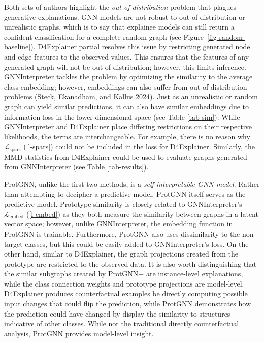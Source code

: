 \documentclass[
  11pt,
  letterpaper,
]{article}
\begin{document}
\quad Both sets of authors highlight the \emph{out-of-distribution}
problem that plagues generative explanations. GNN models are not robust
to out-of-distribution or unrealistic graphs, which is to say that
explainee models can still return a confident classification for a
complete random graph (see Figure~\ref{fig-random-baseline}).
D4Explainer partial resolves this issue by restricting generated node
and edge features to the observed values. This ensures that the features
of any generated graph will not be out-of-distribution; however, this
limits inference. GNNInterpreter tackles the problem by optimizing the
similarity to the average class embedding; however, embeddings can also
suffer from out-of-distribution problems
(\protect\hyperlink{ref-Steck_Ekanadham_Kallus_2024}{Steck, Ekanadham,
and Kallus 2024}). Just as an unrealistic or random graph can yield
similar predictions, it can also have similar embeddings due to
information loss in the lower-dimensional space (see Table
\ref{tab-sim}). While GNNInterpreter and D4Explainer place differing
restrictions on their respective likelihoods, the terms are
interchangeable. For example, there is no reason why
\(\mathcal{L}_\text{spars}\) (\ref{l-spars}) could not be included in
the loss for D4Explainer. Similarly, the MMD statistics from D4Explainer
could be used to evaluate graphs generated from GNNInterpreter (see
Table \ref{tab-results}).

\quad ProtGNN, unlike the first two methods, is a \emph{self
interpretable GNN model}. Rather than attempting to decipher a
predictive model, ProtGNN itself serves as the predictive model.
Prototype similarity is closely related to GNNInterpreter's
\(\mathcal{L}_\text{embed}\) (\ref{l-embed}) as they both measure the
similarity between graphs in a latent vector space; however, unlike
GNNInterpreter, the embedding function in ProtGNN is trainable.
Furthermore, ProtGNN also uses dissimilarity to the non-target classes,
but this could be easily added to GNNInterpreter's loss. On the other
hand, similar to D4Explainer, the graph projections created from the
prototype are restricted to the observed data. It is also worth
distinguishing that the similar subgraphs created by ProtGNN+ are
instance-level explanations, while the class connection weights and
prototype projections are model-level. D4Explainer produces
counterfactual examples be directly computing possible input changes
that could flip the prediction, while ProtGNN demonstrates how the
prediction could have changed by display the similarity to structures
indicative of other classes. While not the traditional directly
counterfactual analysis, ProtGNN provides model-level insight.
\end{document}
